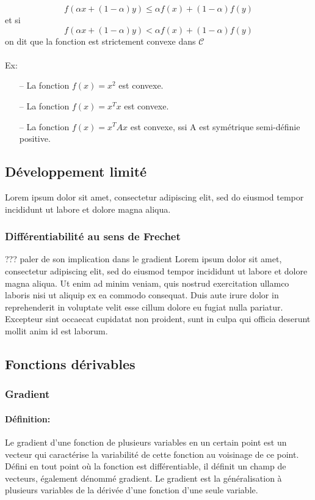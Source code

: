 		\begin{equation}
			f(\alpha x + (1 - \alpha)y) \leq \alpha f(x) + (1 - \alpha)f(y)
			\label{eq_convexe-1}
		\end{equation}
		et si
		\begin{equation}
			f(\alpha x + (1 - \alpha)y) < \alpha f(x) + (1 - \alpha)f(y)
			\label{eq_convexe-2}
		\end{equation}
		on dit que la fonction est strictement convexe dans $\mathcal{C}$\\\\
		Ex: 
		\begin{itemize}
			\item[--] La fonction $ f(x) = x^2$ est convexe. 
			\item[--] La fonction $ f(x) = x^T x$ est convexe.
			\item[--] La fonction $ f(x) = x^T Ax$ est convexe, ssi A est symétrique semi-définie positive.
		\end{itemize}
		 
		
	\subsection{Développement limité}\label{dev_lim}
			Lorem ipsum dolor sit amet, consectetur adipiscing elit, sed do eiusmod tempor incididunt ut labore et dolore magna aliqua.
			\subsubsection{Différentiabilité au sens de Frechet}
			??? paler de son implication dans le gradient 
			Lorem ipsum dolor sit amet, consectetur adipiscing elit, sed do eiusmod tempor incididunt ut labore et dolore magna aliqua. Ut enim ad minim veniam, quis nostrud exercitation ullamco laboris nisi ut aliquip ex ea commodo consequat. Duis aute irure dolor in reprehenderit in voluptate velit esse cillum dolore eu fugiat nulla pariatur. Excepteur sint occaecat cupidatat non proident, sunt in culpa qui officia deserunt mollit anim id est laborum.
		
	\subsection{Fonctions dérivables}
	\subsubsection{Gradient}\label{grad}
		\paragraph*{Définition:}Le gradient d'une fonction de plusieurs variables en un certain point est un vecteur qui caractérise la variabilité de cette fonction au voisinage de ce point. Défini en tout point où la fonction est différentiable, il définit un champ de vecteurs, également dénommé gradient. Le gradient est la généralisation à plusieurs variables de la dérivée d'une fonction d'une seule variable.\\ \\
